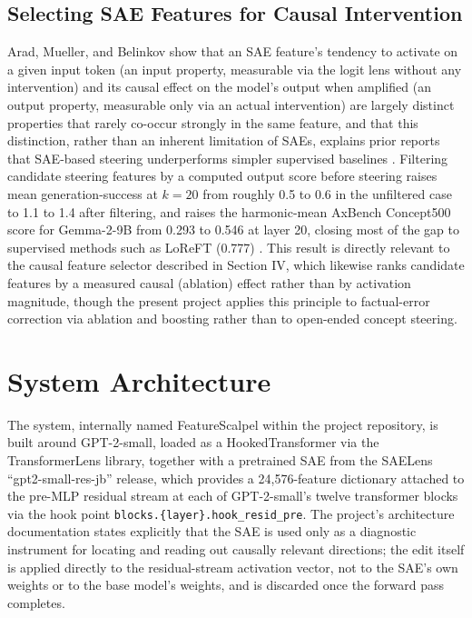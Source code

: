 \documentclass[conference]{IEEEtran}
\begin{document}
\subsection{Selecting SAE Features for Causal Intervention}

Arad, Mueller, and Belinkov show that an SAE feature's tendency to activate on a given input token (an input property, measurable via the logit lens without any intervention) and its causal effect on the model's output when amplified (an output property, measurable only via an actual intervention) are largely distinct properties that rarely co-occur strongly in the same feature, and that this distinction, rather than an inherent limitation of SAEs, explains prior reports that SAE-based steering underperforms simpler supervised baselines \cite{arad2025steering}. Filtering candidate steering features by a computed output score before steering raises mean generation-success at $k=20$ from roughly 0.5 to 0.6 in the unfiltered case to 1.1 to 1.4 after filtering, and raises the harmonic-mean AxBench Concept500 score for Gemma-2-9B from 0.293 to 0.546 at layer 20, closing most of the gap to supervised methods such as LoReFT (0.777) \cite{arad2025steering}. This result is directly relevant to the causal feature selector described in Section IV, which likewise ranks candidate features by a measured causal (ablation) effect rather than by activation magnitude, though the present project applies this principle to factual-error correction via ablation and boosting rather than to open-ended concept steering.

\section{System Architecture}

The system, internally named FeatureScalpel within the project repository, is built around GPT-2-small, loaded as a HookedTransformer via the TransformerLens library, together with a pretrained SAE from the SAELens ``gpt2-small-res-jb'' release, which provides a 24,576-feature dictionary attached to the pre-MLP residual stream at each of GPT-2-small's twelve transformer blocks via the hook point \texttt{blocks.\{layer\}.hook\_resid\_pre}. The project's architecture documentation states explicitly that the SAE is used only as a diagnostic instrument for locating and reading out causally relevant directions; the edit itself is applied directly to the residual-stream activation vector, not to the SAE's own weights or to the base model's weights, and is discarded once the forward pass completes.
\end{document}
